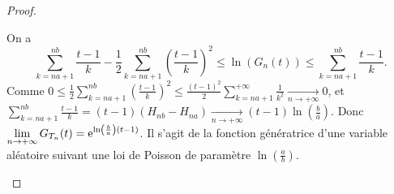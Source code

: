\documentclass[12pt]{article}
\begin{document}
\begin{proof}
\begin{enumerate}
        On a 
        \begin{equation}
            \sum_{k=na+1}^{nb}\frac{t-1}{k}-\frac{1}{2}\sum_{k=na+1}^{nb}\left(\frac{t-1}{k}\right)^{2}\leqslant\ln\left(G_n(t)\right)\leqslant\sum_{k=na+1}^{nb}\frac{t-1}{k}.
        \end{equation}
        Comme $0\leqslant\frac{1}{2}\sum_{k=na+1}^{nb}\left(\frac{t-1}{k}\right)^{2}\leqslant\frac{(t-1)^{2}}{2}\sum_{k=na+1}^{+\infty}\frac{1}{k^{2}}\xrightarrow[n\to+\infty]{}0$, et $\sum_{k=na+1}^{nb}\frac{t-1}{k}=(t-1)(H_{nb}-H_{na})\xrightarrow[n\to+\infty]{}(t-1)\ln\left(\frac{b}{a}\right)$.
        Donc $\lim\limits_{n\to+\infty}G_{T_n}(t)=\mathrm{e}^{\ln\left(\frac{b}{a}\right)(t-1)}$. Il s'agit de la fonction génératrice d'une variable aléatoire suivant une loi de Poisson de paramètre $\ln\left(\frac{a}{b}\right)$.
    \end{enumerate}
\end{proof}
\end{document}
